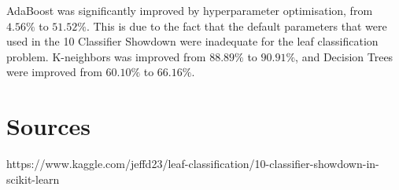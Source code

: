 \documentclass{article}
\begin{document}
AdaBoost was significantly improved by hyperparameter optimisation, from $4.56\%$ to $51.52\%$. This is due to the fact that the default parameters that were used in the 10 Classifier Showdown \cite{showdown} were inadequate for the leaf classification problem. K-neighbors was improved from $88.89\%$ to $90.91\%$, and Decision Trees were improved from $60.10\%$ to $66.16\%$. 

	





\section{Sources}


https://www.kaggle.com/jeffd23/leaf-classification/10-classifier-showdown-in-scikit-learn
\end{document}
